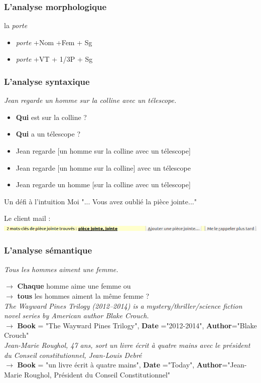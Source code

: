 \begin{frame}
\frametitle{L'analyse morphologique}
la \textit{porte}

\begin{itemize}[<+->]
\item \textit{porte} +Nom +Fem + Sg
\item \textit{porte} +VT + 1/3P + Sg
\end{itemize}

\end{frame}



\begin{frame}
\frametitle{L'analyse syntaxique}
\textit{ Jean regarde un homme sur la colline avec un télescope.}
\begin{itemize}
\item \textbf{Qui} est sur la colline ?
\item \textbf{Qui} a un télescope ?
\end{itemize}
\begin{itemize}[<+->]
\item Jean regarde [un homme sur la colline avec un télescope]
\item Jean regarde [un homme sur la colline] avec un télescope
\item Jean regarde un homme [sur la colline avec un télescope]
\end{itemize}

\pause
\begin{block}{Un défi à l'intuition}
Moi "... Vous avez oublié la pièce jointe..."

Le client mail :
\includegraphics[width=.9\textwidth]{images/PJ_error.png}
\end{block}
\end{frame}


\begin{frame}
\frametitle{L'analyse sémantique}
 \textit{Tous les hommes aiment une femme.}
 \medskip

$\rightarrow$ \textbf{Chaque} homme aime une femme ou 
\\$\rightarrow$  \textbf{tous} les hommes aiment la même femme ?\\
\pause
 \medskip
\textit{The Wayward Pines Trilogy (2012–2014) is a mystery/thriller/science fiction novel series by American author Blake Crouch.}\\
 \medskip
$\rightarrow$ \textbf{Book} = "The Wayward Pines Trilogy", \textbf{Date} ="2012-2014", \textbf{Author}="Blake Crouch"\\
\pause
\medskip
\textit{Jean-Marie Roughol, 47 ans, sort un livre écrit à quatre mains avec le président du Conseil constitutionnel, Jean-Louis Debré}\\
\medskip
$\rightarrow$ \textbf{Book }= "un livre écrit à quatre mains", \textbf{Date }="Today", \textbf{Author}="Jean-Marie Roughol, Président du Conseil Constitutionnel"
\end{frame}

